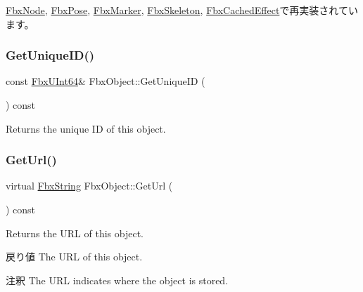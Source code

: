\hyperlink{class_fbx_node_a802220645ef4d155755ebbf6f746a15c}{Fbx\+Node}, \hyperlink{class_fbx_pose_ade93c02bcfa5b5694a6945175387d285}{Fbx\+Pose}, \hyperlink{class_fbx_marker_a8418dc0f13a8197949a412604787c60d}{Fbx\+Marker}, \hyperlink{class_fbx_skeleton_a95bceb7989084e51a450525b4f57698b}{Fbx\+Skeleton}, \hyperlink{class_fbx_cached_effect_a895c62dc90594a2df7d9392632b626a6}{Fbx\+Cached\+Effect}で再実装されています。

\mbox{\label{class_fbx_object_a30e02c36e4adf5e42499c1f39ebfae08}} 
\subsubsection{\texorpdfstring{Get\+Unique\+I\+D()}{GetUniqueID()}}
{\footnotesize\ttfamily const \hyperlink{fbxtypes_8h_a9beeca85cdc9941e912fe9eac7709b53}{Fbx\+U\+Int64}\& Fbx\+Object\+::\+Get\+Unique\+ID (\begin{DoxyParamCaption}{ }\end{DoxyParamCaption}) const}



Returns the unique ID of this object. 

\mbox{\label{class_fbx_object_acce60f1ae8d6b0ffba2de85c04766194}} 
\subsubsection{\texorpdfstring{Get\+Url()}{GetUrl()}}
{\footnotesize\ttfamily virtual \hyperlink{class_fbx_string}{Fbx\+String} Fbx\+Object\+::\+Get\+Url (\begin{DoxyParamCaption}{ }\end{DoxyParamCaption}) const\hspace{0.3cm}{\ttfamily [virtual]}}

Returns the U\+RL of this object. \begin{DoxyReturn}{戻り値}
The U\+RL of this object. 
\end{DoxyReturn}
\begin{DoxyRemark}{注釈}
The U\+RL indicates where the object is stored. 
\end{DoxyRemark}
\mbox{\label{class_fbx_object_a434f9f31f49ddea0ce7248a75bbed30a}} 
